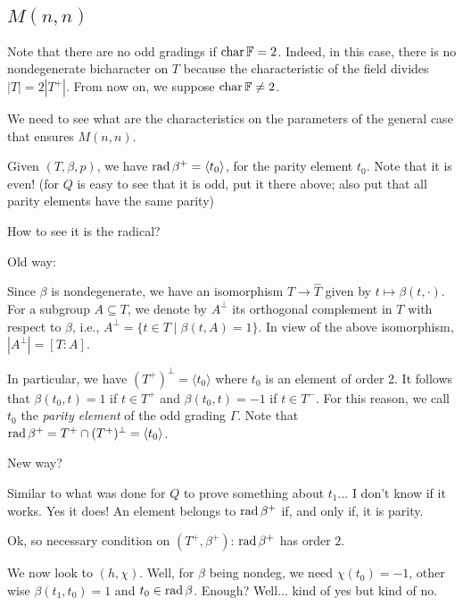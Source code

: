 
\subsection{\texorpdfstring{$M(n,n)$}{M(n,n)}}

Note that there are no odd gradings if $\operatorname{char} \mathbb{F} =2$. 
Indeed, in this case, there is no nondegenerate bicharacter on $T$ because the characteristic of the field divides $|T|=2|T^+|$. 
From now on, we suppose $\operatorname{char} \mathbb{F} \neq 2$.

We need to see what are the characteristics on the parameters of the general case that ensures $M(n,n)$.

Given $(T, \beta, p)$, we have $\operatorname{rad} \beta^+ = \langle t_0 \rangle$, for the parity element $t_0$. 
Note that it is even! (for $Q$ is easy to see that it is odd, put it there above; also put that all parity elements have the same parity)

How to see it is the radical? 

Old way:


Since $\beta$ is nondegenerate, we have an isomorphism $T\rightarrow \widehat T$ given by $t\mapsto \beta(t,\cdot)$. For a subgroup $A\subseteq T$, we denote by $A^\perp$ its orthogonal complement in $T$ with respect to $\beta$, i.e., $A^\perp = \{t\in T\mid \beta(t, A) =1\}$. In view of the above isomorphism, $|A^\perp| = [T:A]$.

In particular, we have $(T^+)^\perp = \langle t_0 \rangle$ where $t_0$ is an element of order 2. It follows that $\beta(t_0, t) = 1$ if $t\in T^+$ and $\beta(t_0, t) = -1$ if $t\in T^-$. For this reason, we call $t_0$ the \emph{parity element} of the odd grading $\Gamma$. Note that $\operatorname{rad} \beta^+ = T^+\cap (T^+)^\perp = \langle t_0 \rangle$.

New way?

Similar to what was done for $Q$ to prove something about $t_1$... I don't know if it works. 
Yes it does! 
An element belongs to $\operatorname{rad}\beta^+$ if, and only if, it is parity. 

Ok, so necessary condition on $(T^+, \beta^+)$: $\operatorname{rad}\beta^+$ has order $2$.

We now look to $(h, \chi)$. 
Well, for $\beta$ being nondeg, we need $\chi(t_0) = -1$, other wise $\beta(t_1, t_0) = 1$ and $t_0 \in \operatorname{rad}\beta$. 
Enough? 
Well... kind of yes but kind of no.

